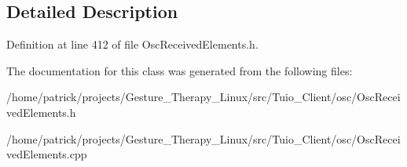 \subsection{Detailed Description}


Definition at line 412 of file Osc\+Received\+Elements.\+h.



The documentation for this class was generated from the following files\+:\begin{DoxyCompactItemize}
\item 
/home/patrick/projects/\+Gesture\+\_\+\+Therapy\+\_\+\+Linux/src/\+Tuio\+\_\+\+Client/osc/Osc\+Received\+Elements.\+h\item 
/home/patrick/projects/\+Gesture\+\_\+\+Therapy\+\_\+\+Linux/src/\+Tuio\+\_\+\+Client/osc/Osc\+Received\+Elements.\+cpp\end{DoxyCompactItemize}
